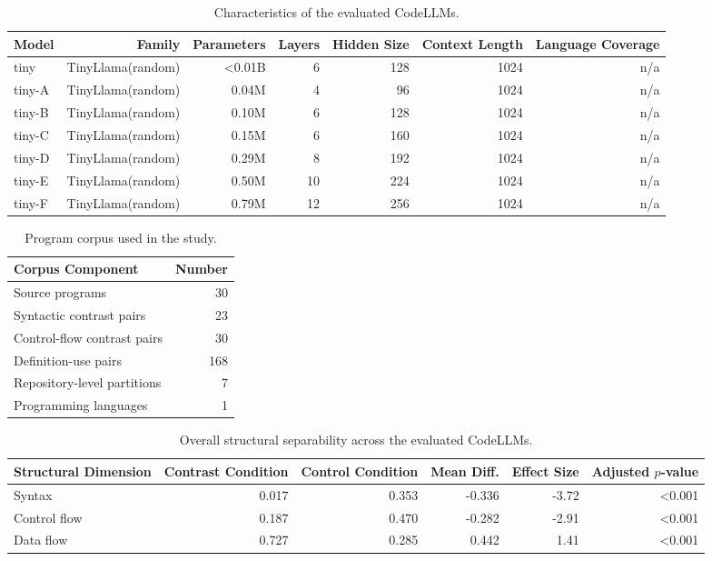 \begin{table}[t]
\centering
\caption{Characteristics of the evaluated CodeLLMs.}
\label{tab:models}
\begin{tabular}{lrrrrrr}
\toprule
Model & Family & Parameters & Layers & Hidden Size & Context Length & Language Coverage \\
\midrule
tiny & TinyLlama(random) & \textless{}0.01B & 6 & 128 & 1024 & n/a \\
tiny-A & TinyLlama(random) & 0.04M & 4 & 96 & 1024 & n/a \\
tiny-B & TinyLlama(random) & 0.10M & 6 & 128 & 1024 & n/a \\
tiny-C & TinyLlama(random) & 0.15M & 6 & 160 & 1024 & n/a \\
tiny-D & TinyLlama(random) & 0.29M & 8 & 192 & 1024 & n/a \\
tiny-E & TinyLlama(random) & 0.50M & 10 & 224 & 1024 & n/a \\
tiny-F & TinyLlama(random) & 0.79M & 12 & 256 & 1024 & n/a \\
\bottomrule
\end{tabular}
\end{table}

\begin{table}[t]
\centering
\caption{Program corpus used in the study.}
\label{tab:corpus}
\begin{tabular}{lr}
\toprule
Corpus Component & Number \\
\midrule
Source programs & 30 \\
Syntactic contrast pairs & 23 \\
Control-flow contrast pairs & 30 \\
Definition-use pairs & 168 \\
Repository-level partitions & 7 \\
Programming languages & 1 \\
\bottomrule
\end{tabular}
\end{table}

\begin{table}[t]
\centering
\caption{Overall structural separability across the evaluated CodeLLMs.}
\label{tab:sep}
\begin{tabular}{lrrrrr}
\toprule
Structural Dimension & Contrast Condition & Control Condition & Mean Diff. & Effect Size & Adjusted $p$-value \\
\midrule
Syntax & 0.017 & 0.353 & -0.336 & -3.72 & \textless{}0.001 \\
Control flow & 0.187 & 0.470 & -0.282 & -2.91 & \textless{}0.001 \\
Data flow & 0.727 & 0.285 & 0.442 & 1.41 & \textless{}0.001 \\
\bottomrule
\end{tabular}
\end{table}

